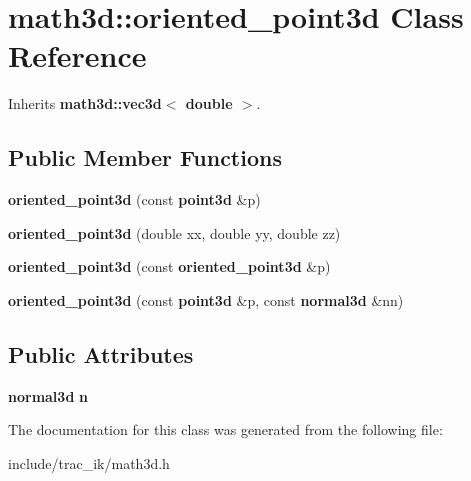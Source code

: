 \section{math3d\-:\-:oriented\-\_\-point3d Class Reference}
\label{classmath3d_1_1oriented__point3d}


Inherits {\bf math3d\-::vec3d$<$ double $>$}.

\subsection*{Public Member Functions}
\begin{DoxyCompactItemize}
\item 
{\bfseries oriented\-\_\-point3d} (const {\bf point3d} \&p)\label{classmath3d_1_1oriented__point3d_ae3ca857974c220976755485aa1ad3072}

\item 
{\bfseries oriented\-\_\-point3d} (double xx, double yy, double zz)\label{classmath3d_1_1oriented__point3d_a529201e252c911f55eb6353f1979617b}

\item 
{\bfseries oriented\-\_\-point3d} (const {\bf oriented\-\_\-point3d} \&p)\label{classmath3d_1_1oriented__point3d_a0803a56f410adfc86d8842f152996fa6}

\item 
{\bfseries oriented\-\_\-point3d} (const {\bf point3d} \&p, const {\bf normal3d} \&nn)\label{classmath3d_1_1oriented__point3d_abe2d1a1236e363834a8e8b63b752e865}

\end{DoxyCompactItemize}
\subsection*{Public Attributes}
\begin{DoxyCompactItemize}
\item 
{\bf normal3d} {\bfseries n}\label{classmath3d_1_1oriented__point3d_ace4f95d6b6bca8a96063a22b006ec48f}

\end{DoxyCompactItemize}


The documentation for this class was generated from the following file\-:\begin{DoxyCompactItemize}
\item 
include/trac\-\_\-ik/math3d.\-h\end{DoxyCompactItemize}
